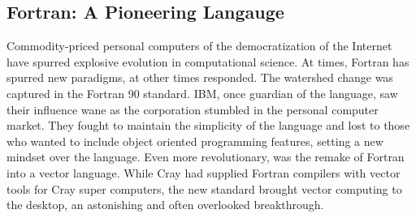 \subsection{Fortran: A Pioneering Langauge}
Commodity-priced personal computers of the democratization of the Internet have spurred explosive evolution in computational science. At times, Fortran has spurred new paradigms, at other times responded. The watershed change was captured in the Fortran 90 standard. IBM, once  guardian of the language, saw their influence wane as the corporation stumbled in the personal computer market. They fought to maintain the simplicity of the language and lost to those who wanted to include object oriented programming features, setting a new mindset over the language. Even more revolutionary, was the remake of Fortran into a vector language. While Cray had supplied Fortran compilers with vector tools for Cray super computers, the new standard brought vector computing to the desktop, an astonishing and often overlooked breakthrough.
